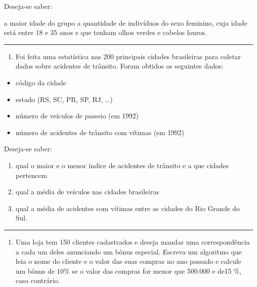 \documentclass[12pt,a4paper]{article}
\providecommand{\tightlist}{%
      \setlength{\itemsep}{0pt}\setlength{\parskip}{0pt}}
\begin{document}
Deseja-se saber:

a maior idade do grupo a quantidade de indivíduos do sexo feminino, cuja
idade está entre 18 e 35 anos e que tenham olhos verdes e cabelos
louros.

    \begin{center}\rule{0.5\linewidth}{0.5pt}\end{center}

\begin{enumerate}
\def\labelenumi{\arabic{enumi}.}
\setcounter{enumi}{11}
\tightlist
\item
  Foi feita uma estatística nas 200 principais cidades brasileiras para
  coletar dados sobre acidentes de trânsito. Foram obtidos os seguintes
  dados:
\end{enumerate}

\begin{itemize}
\item
  código da cidade
\item
  estado (RS, SC, PR, SP, RJ, \ldots)
\item
  número de veículos de passeio (em 1992)
\item
  número de acidentes de trânsito com vítimas (em 1992)
\end{itemize}

Deseja-se saber:

\begin{enumerate}
\def\labelenumi{\alph{enumi})}
\item
  qual o maior e o menor índice de acidentes de trânsito e a que cidades
  pertencem
\item
  qual a média de veículos nas cidades brasileiras
\item
  qual a média de acidentes com vítimas entre as cidades do Rio Grande
  do Sul.
\end{enumerate}

    \begin{center}\rule{0.5\linewidth}{0.5pt}\end{center}

\begin{enumerate}
\def\labelenumi{\arabic{enumi}.}
\setcounter{enumi}{12}
\tightlist
\item
  Uma loja tem 150 clientes cadastrados e deseja mandar uma
  correspondência a cada um deles anunciando um bônus especial. Escreva
  um algoritmo que leia o nome do cliente e o valor das suas compras no
  ano passado e calcule um bônus de 10\% se o valor das compras for
  menor que 500.000 e de15 \%, caso contrário.
\end{enumerate}
\end{document}
